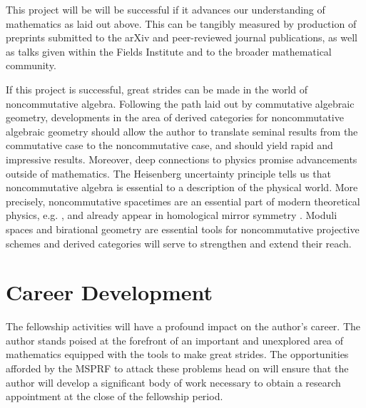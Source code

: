 \documentclass[11pt]{article}
\begin{document}

This project will be will be successful if it advances our understanding of mathematics as laid out above.  This can be tangibly measured by production of preprints submitted to the arXiv and peer-reviewed journal publications, as well as talks given within the Fields Institute and to the broader mathematical community.


If this project is successful, great strides can be made in the world of noncommutative algebra.
Following the path laid out by commutative algebraic geometry, developments in the area of derived categories for noncommutative algebraic geometry should allow the author to translate seminal results from the commutative case to the noncommutative case, and should yield rapid and impressive results.
Moreover, deep connections to physics promise advancements outside of mathematics.
The Heisenberg uncertainty principle tells us that noncommutative algebra is essential to a description of the physical world.
More precisely, noncommutative spacetimes are an essential part of modern theoretical physics, e.g. \cite{DoNe01}, and already appear in homological mirror symmetry \cite{AKO08}.
Moduli spaces and birational geometry are essential tools for noncommutative projective schemes and derived categories will serve to strengthen and extend their reach.



\section{Career Development}
The fellowship activities will have a profound impact on the author's career.
The author stands poised at the forefront of an important and unexplored area of mathematics equipped with the tools to make great strides.
The opportunities afforded by the MSPRF to attack these problems head on will ensure that the author will develop a significant body of work necessary to obtain a research appointment at the close of the fellowship period.
\end{document}
